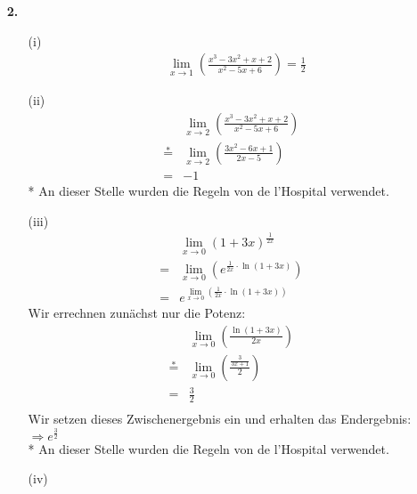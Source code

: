 \documentclass[a4paper,11pt]{article}
\begin{document}
\begin{enumerate}
        \item[\textbf{2.}]
            \begin{enumerate}
                \item[(i)]
                    \begin{align*}
                        &\underset{x \to 1}{\lim} \left( \frac{x^3-3x^2+x+2}{x^2-5x+6} \right) = \frac{1}{2}
                    \end{align*}
                \item[(ii)]
                    \begin{align*}
                        &\underset{x \to 2}{\lim} \left( \frac{x^3-3x^2+x+2}{x^2-5x+6} \right)\\
                        \overset{*}{=}&\underset{x \to 2}{\lim} \left( \frac{3x^2-6x+1}{2x-5} \right)\\
                        =& -1
                    \end{align*}
                    * An dieser Stelle wurden die Regeln von de l'Hospital verwendet.
                \item[(iii)]
                    \begin{align*}
                        &\underset{x \to 0}{\lim} (1+3x)^{\frac{1}{2x}}\\
                        =&\underset{x \to 0}{\lim} \left( e^{\frac{1}{2x} \cdot \ln(1+3x)} \right)\\
                        =&e^{\underset{x \to 0}{\lim} \left( \frac{1}{2x} \cdot \ln(1+3x) \right)}
                    \end{align*}
                    Wir errechnen zunächst nur die Potenz:
                    \begin{align*}
                        &\underset{x \to 0}{\lim} \left( \frac{\ln(1+3x)}{2x} \right)\\
                        \overset{*}{=}&\underset{x \to 0}{\lim} \left( \frac{\frac{3}{3x+1}}{2} \right)\\
                        =& \frac{3}{2}\\
                    \end{align*}
                    Wir setzen dieses Zwischenergebnis ein und erhalten das Endergebnis:\\
                        $\Rightarrow e^{\frac{3}{2}}$\\
                    * An dieser Stelle wurden die Regeln von de l'Hospital verwendet.
                \item[(iv)]

\end{enumerate}
\end{enumerate}
\end{document}
